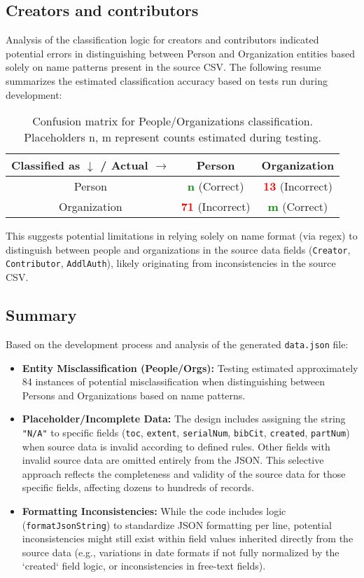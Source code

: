 \documentclass[11pt, a4paper]{article}
\begin{document}
\subsection{Creators and contributors}
Analysis of the classification logic for creators and contributors indicated potential errors in distinguishing between Person and Organization entities based solely on name patterns present in the source CSV. The following resume summarizes the estimated classification accuracy based on tests run during development:
\begin{table}[h]
    \centering
    \begin{tabular}{|c|c|c|}
        \hline
        Classified as $\downarrow$ / Actual $\rightarrow$ & Person & Organization \\
        \hline
        Person &  \textcolor{green}{\textbf{n}} (Correct) & \textcolor{red}{\textbf{13}} (Incorrect) \\
        \hline
        Organization & \textcolor{red}{\textbf{71}} (Incorrect) &  \textcolor{green}{\textbf{m}} (Correct) \\
        \hline
    \end{tabular}
    \caption{Confusion matrix for People/Organizations classification. Placeholders n, m represent counts estimated during testing.}
    \label{tab:people_org}
\end{table}
\newline
This suggests potential limitations in relying solely on name format (via regex) to distinguish between people and organizations in the source data fields (\texttt{Creator}, \texttt{Contributor}, \texttt{AddlAuth}), likely originating from inconsistencies in the source CSV.

\subsection{Summary}
Based on the development process and analysis of the generated \texttt{data.json} file:
\begin{itemize}
    \item \textbf{Entity Misclassification (People/Orgs):} Testing estimated approximately 84 instances of potential misclassification when distinguishing between Persons and Organizations based on name patterns.
    \item \textbf{Placeholder/Incomplete Data:} The design includes assigning the string \texttt{"N/A"} to specific fields (\texttt{toc}, \texttt{extent}, \texttt{serialNum}, \texttt{bibCit}, \texttt{created}, \texttt{partNum}) when source data is invalid according to defined rules. Other fields with invalid source data are omitted entirely from the JSON. This selective approach reflects the completeness and validity of the source data for those specific fields, affecting dozens to hundreds of records.
    \item \textbf{Formatting Inconsistencies:} While the code includes logic (\texttt{formatJsonString}) to standardize JSON formatting per line, potential inconsistencies might still exist within field values inherited directly from the source data (e.g., variations in date formats if not fully normalized by the `created` field logic, or inconsistencies in free-text fields).
\end{itemize}
\end{document}
